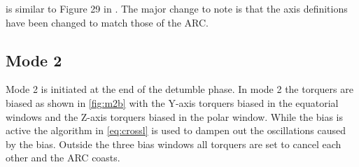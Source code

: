  is similar to Figure 29 in \cite{Mentch11}. The major change to note is that the axis definitions have been changed to match those of the \ac{ARC}.

\subsection{Mode 2}

Mode 2 is initiated at the end of the detumble phase. In mode 2 the torquers are biased as shown in \cref{fig:m2b} with the Y-axis torquers biased in the equatorial windows and the Z-axis torquers biased in the polar window. While the bias is active the algorithm in \cref{eq:crossl} is used to dampen out the oscillations caused by the bias. Outside the three bias windows all torquers are set to cancel each other and the \ac{ARC} coasts.

